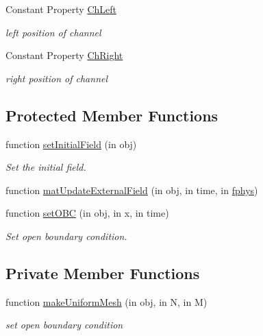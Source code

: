 \begin{DoxyCompactItemize}
Constant Property \hyperlink{class_tidal_river_channel2d_ac9ef1842991336289e0e0a503c044377}{Ch\+Left}
\begin{DoxyCompactList}\small\item\em left position of channel \end{DoxyCompactList}\item 
Constant Property \hyperlink{class_tidal_river_channel2d_a3e5e9f426af3083a11c794c582b336c2}{Ch\+Right}
\begin{DoxyCompactList}\small\item\em right position of channel \end{DoxyCompactList}\end{DoxyCompactItemize}
\subsection*{Protected Member Functions}
\begin{DoxyCompactItemize}
\item 
function \hyperlink{class_tidal_river_channel2d_a3fed1a8039f2277301f10fed130eb048}{set\+Initial\+Field} (in obj)
\begin{DoxyCompactList}\small\item\em Set the initial field. \end{DoxyCompactList}\item 
function \hyperlink{class_tidal_river_channel2d_a72fa885d18c76c77bd61c71f31ddbdfe}{mat\+Update\+External\+Field} (in obj, in time, in \hyperlink{class_ndg_phys_a6b25724fc9474d32018439009072f0a9}{fphys})
\item 
function \hyperlink{class_tidal_river_channel2d_a330bdfa1ddf1fb311ab4b54b8af0a646}{set\+O\+BC} (in obj, in x, in time)
\begin{DoxyCompactList}\small\item\em Set open boundary condition. \end{DoxyCompactList}\end{DoxyCompactItemize}
\subsection*{Private Member Functions}
\begin{DoxyCompactItemize}
\item 
function \hyperlink{class_tidal_river_channel2d_ab3560e64f679d2ae5ca3f39dd2c01654}{make\+Uniform\+Mesh} (in obj, in N, in M)
\begin{DoxyCompactList}\small\item\em set open boundary condition \end{DoxyCompactList}\end{DoxyCompactItemize}

